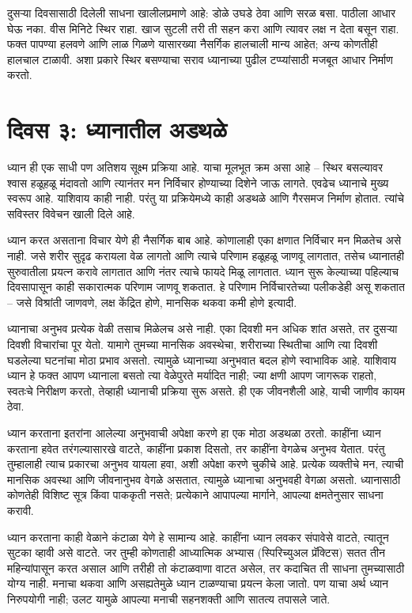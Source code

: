 दुसऱ्या दिवसासाठी दिलेली साधना खालीलप्रमाणे आहे: डोळे उघडे ठेवा आणि सरळ बसा. पाठीला आधार घेऊ नका. वीस मिनिटे स्थिर राहा. खाज सुटली तरी ती सहन करा आणि त्यावर लक्ष न देता बसून राहा. फक्त पापण्या हलवणे आणि लाळ गिळणे यासारख्या नैसर्गिक हालचाली मान्य आहेत; अन्य कोणतीही हालचाल टाळावी. अशा प्रकारे स्थिर बसण्याचा सराव ध्यानाच्या पुढील टप्प्यांसाठी मजबूत आधार निर्माण करतो.


\section*{दिवस ३: ध्यानातील अडथळे}
ध्यान ही एक साधी पण अतिशय सूक्ष्म प्रक्रिया आहे. याचा मूलभूत क्रम असा आहे – स्थिर बसल्यावर श्वास हळूहळू मंदावतो आणि त्यानंतर मन निर्विचार होण्याच्या दिशेने जाऊ लागते. एवढेच ध्यानाचे मुख्य स्वरूप आहे. याशिवाय काही नाही. परंतु या प्रक्रियेमध्ये काही अडथळे आणि गैरसमज निर्माण होतात. त्यांचे सविस्तर विवेचन खाली दिले आहे.

ध्यान करत असताना विचार येणे ही नैसर्गिक बाब आहे. कोणालाही एका क्षणात निर्विचार मन मिळतेच असे नाही. जसे शरीर सुदृढ करायला वेळ लागतो आणि त्याचे परिणाम हळूहळू जाणवू लागतात, तसेच ध्यानातही सुरुवातीला प्रयत्न करावे लागतात आणि नंतर त्याचे फायदे मिळू लागतात. ध्यान सुरू केल्याच्या पहिल्याच दिवसापासून काही सकारात्मक परिणाम जाणवू शकतात. हे परिणाम निर्विचारतेच्या पलीकडेही असू शकतात – जसे विश्रांती जाणवणे, लक्ष केंद्रित होणे, मानसिक थकवा कमी होणे इत्यादी.

ध्यानाचा अनुभव प्रत्येक वेळी तसाच मिळेलच असे नाही. एका दिवशी मन अधिक शांत असते, तर दुसऱ्या दिवशी विचारांचा पूर येतो. यामागे तुमच्या मानसिक अवस्थेचा, शरीराच्या स्थितीचा आणि त्या दिवशी घडलेल्या घटनांचा मोठा प्रभाव असतो. त्यामुळे ध्यानाच्या अनुभवात बदल होणे स्वाभाविक आहे. याशिवाय ध्यान हे फक्त आपण ध्यानाला बसतो त्या वेळेपुरते मर्यादित नाही; ज्या क्षणी आपण जागरूक राहतो, स्वतःचे निरीक्षण करतो, तेव्हाही ध्यानाची प्रक्रिया सुरू असते. ही एक जीवनशैली आहे, याची जाणीव कायम ठेवा.

ध्यान करताना इतरांना आलेल्या अनुभवाची अपेक्षा करणे हा एक मोठा अडथळा ठरतो. काहींना ध्यान करताना हवेत तरंगल्यासारखे वाटते, काहींना प्रकाश दिसतो, तर काहींना वेगळेच अनुभव येतात. परंतु तुम्हालाही त्याच प्रकारचा अनुभव यायला हवा, अशी अपेक्षा करणे चुकीचे आहे. प्रत्येक व्यक्तीचे मन, त्याची मानसिक अवस्था आणि जीवनानुभव वेगळे असतात, त्यामुळे ध्यानाचा अनुभवही वेगळा असतो. ध्यानासाठी कोणतेही विशिष्ट सूत्र किंवा पाककृती नसते; प्रत्येकाने आपापल्या मार्गाने, आपल्या क्षमतेनुसार साधना करावी.

ध्यान करताना काही वेळाने कंटाळा येणे हे सामान्य आहे. काहींना ध्यान लवकर संपावेसे वाटते, त्यातून सुटका व्हावी असे वाटते. जर तुम्ही कोणताही आध्यात्मिक अभ्यास (स्पिरिच्युअल प्रॅक्टिस) सतत तीन महिन्यांपासून करत असाल आणि तरीही तो कंटाळवाणा वाटत असेल, तर कदाचित ती साधना तुमच्यासाठी योग्य नाही. मनाचा थकवा आणि असह्यतेमुळे ध्यान टाळण्याचा प्रयत्न केला जातो. पण याचा अर्थ ध्यान निरुपयोगी नाही; उलट यामुळे आपल्या मनाची सहनशक्ती आणि सातत्य तपासले जाते.

